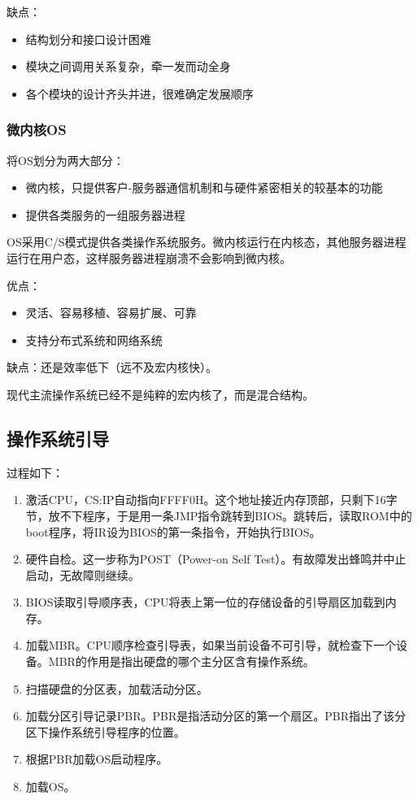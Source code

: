 \documentclass[12pt, a4paper, oneside]{ctexart}
\begin{document}
缺点：
\begin{itemize}
    \item 结构划分和接口设计困难
    \item 模块之间调用关系复杂，牵一发而动全身
    \item 各个模块的设计齐头并进，很难确定发展顺序
\end{itemize}

\subsubsection{微内核OS}

将OS划分为两大部分：
\begin{itemize}
    \item 微内核，只提供客户-服务器通信机制和与硬件紧密相关的较基本的功能
    \item 提供各类服务的一组服务器进程
\end{itemize}

OS采用C/S模式提供各类操作系统服务。微内核运行在内核态，其他服务器进程运行在用户态，这样服务器进程崩溃不会影响到微内核。

优点：
\begin{itemize}
    \item 灵活、容易移植、容易扩展、可靠
    \item 支持分布式系统和网络系统
\end{itemize}

缺点：还是效率低下（远不及宏内核快）。

现代主流操作系统已经不是纯粹的宏内核了，而是混合结构。

\subsection{操作系统引导}

过程如下：
\begin{enumerate}
  \item 激活CPU，CS:IP自动指向FFFF0H。这个地址接近内存顶部，只剩下16字节，放不下程序，于是用一条JMP指令跳转到BIOS。跳转后，读取ROM中的boot程序，将IR设为BIOS的第一条指令，开始执行BIOS。
  \item 硬件自检。这一步称为POST（Power-on Self Test）。有故障发出蜂鸣并中止启动，无故障则继续。
  \item BIOS读取引导顺序表，CPU将表上第一位的存储设备的引导扇区加载到内存。
  \item 加载MBR。CPU顺序检查引导表，如果当前设备不可引导，就检查下一个设备。MBR的作用是指出硬盘的哪个主分区含有操作系统。
  \item 扫描硬盘的分区表，加载活动分区。
  \item 加载分区引导记录PBR。PBR是指活动分区的第一个扇区。PBR指出了该分区下操作系统引导程序的位置。
  \item 根据PBR加载OS启动程序。
  \item 加载OS。
\end{enumerate}
\end{document}
